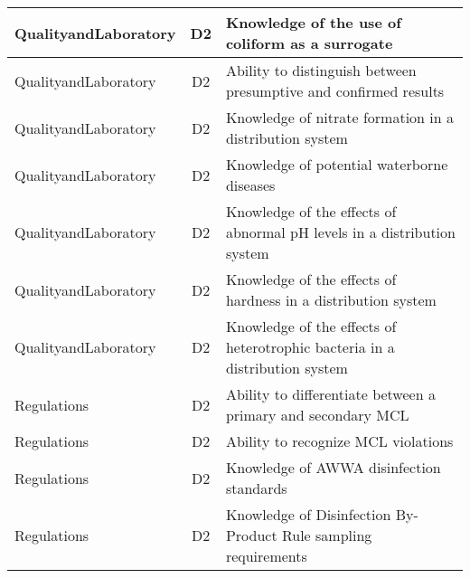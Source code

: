 \documentclass{article}
\begin{document}
\begin{table}[]
\begin{tabular}{|l|c|l|}
QualityandLaboratory                   & D2             & Knowledge of the use   of coliform as a surrogate                                                                                 \\ \hline
QualityandLaboratory                   & D2             & Ability to   distinguish between presumptive and confirmed results                                                                \\ \hline
QualityandLaboratory                   & D2             & Knowledge of nitrate   formation in a distribution system                                                                         \\ \hline
QualityandLaboratory                   & D2             & Knowledge of   potential waterborne diseases                                                                                      \\ \hline
QualityandLaboratory                   & D2             & Knowledge of the   effects of abnormal pH levels in a distribution system                                                         \\ \hline
QualityandLaboratory                   & D2             & Knowledge of the   effects of hardness in a distribution system                                                                   \\ \hline
QualityandLaboratory                   & D2             & Knowledge of the   effects of heterotrophic bacteria in a distribution system                                                     \\ \hline
Regulations                            & D2             & Ability to   differentiate between a primary and secondary MCL                                                                    \\ \hline
Regulations                            & D2             & Ability to recognize   MCL violations                                                                                             \\ \hline
Regulations                            & D2             & Knowledge of AWWA   disinfection standards                                                                                        \\ \hline
Regulations                            & D2             & Knowledge of   Disinfection By-Product Rule sampling requirements                                                                 \\ \hline

\end{tabular}
\end{table}
\end{document}
